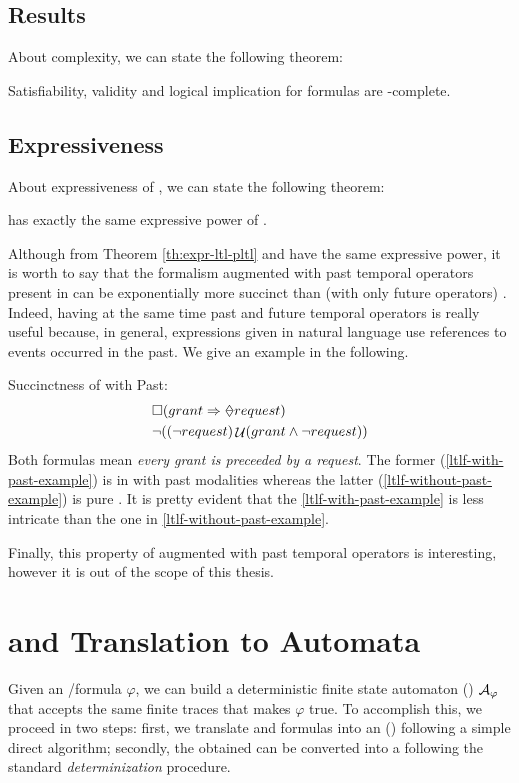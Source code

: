 \subsection{Results}
About \PLTL complexity, we can state the following theorem:
\begin{theorem}
Satisfiability, validity and logical implication for \PLTL formulas are \PSPACE-complete.
\end{theorem}

\subsection{Expressiveness}
About expressiveness of \PLTL, we can state the following theorem:
\begin{theorem}\label{th:expr-ltl-pltl}
\PLTL has exactly the same expressive power of \LTLf.
\end{theorem}

\noindent Although from Theorem \ref{th:expr-ltl-pltl} \PLTL and \LTL have the same expressive power, it is worth to say that the \LTLf formalism augmented with past temporal operators present in \PLTL can be exponentially more succinct than \LTLf (with only future operators) \citep{markey2003temporal}.
Indeed, having at the same time past and future temporal operators is really useful because, in general, expressions given in natural language use references to events occurred in the past. We give an example in the following.
\begin{example}\label{succinctness-example}
Succinctness of \LTLf with Past:
\begin{align}
&\Box(grant \Rightarrow \Once request)\label{ltlf-with-past-example}\\
&\lnot((\lnot request) \lUntil (grant \lAND \lnot request))\label{ltlf-without-past-example}
\end{align}
Both formulas mean \emph{every grant is preceeded by a request}. The  former (\ref{ltlf-with-past-example}) is in \LTLf with past modalities whereas the latter (\ref{ltlf-without-past-example}) is pure \LTLf. It is pretty evident that the \ref{ltlf-with-past-example} is less intricate than the one in \ref{ltlf-without-past-example}.
\end{example}
Finally, this property of \LTLf augmented with past temporal operators is interesting, however it is out of the scope of this thesis.
\section{\LTLf and \PLTL Translation to  Automata}\label{sec:formula-to-automa}
Given an \LTLf/\PLTL formula $\varphi$, we can build a deterministic finite state automaton (\DFA) \citep{Rabin:1959:FAD:1661907.1661909} 
$\mathcal{A}_\varphi$ that accepts the same finite traces that makes $\varphi$ true. To accomplish this, we proceed in two steps: first, we translate \LTLf and \PLTL formulas into an (\NFA) \citep{DeGiacomo:2015:SLL:2832415.2832466} following a simple direct algorithm; secondly, the obtained \NFA can be converted into a \DFA following the standard \emph{determinization}  procedure.


